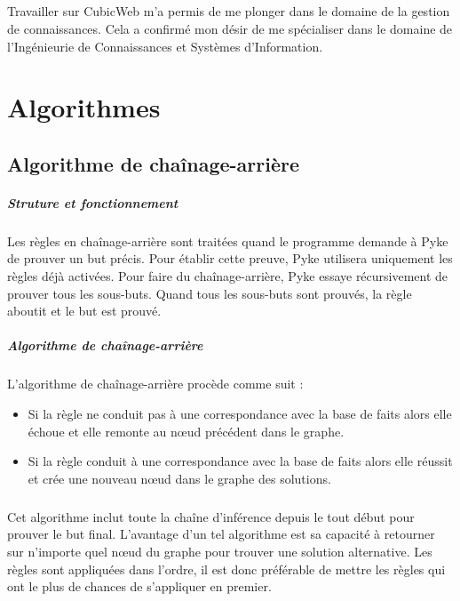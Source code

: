 \documentclass {report}
\begin{document}
\paragraph{}
Travailler sur CubicWeb m'a permis de me plonger dans le domaine de la gestion de connaissances. Cela a confirmé mon désir de me spécialiser dans le domaine de l'Ingénieurie de Connaissances et Systèmes d'Information.


\appendix


\chapter{Algorithmes}
\section{Algorithme de chaînage-arrière}

\paragraph{Struture et fonctionnement}
Les règles en chaînage-arrière sont traitées quand le programme demande à Pyke de prouver un but précis. Pour établir cette preuve, Pyke utilisera uniquement les règles déjà activées. Pour faire du chaînage-arrière, Pyke essaye récursivement de prouver tous les sous-buts. Quand tous les sous-buts sont prouvés, la règle aboutit et le but est prouvé.

\paragraph{Algorithme de chaînage-arrière}
    L'algorithme de chaînage-arrière procède comme suit : 
\begin{itemize}
    \item Si la règle ne conduit pas à une correspondance avec la base de faits alors elle échoue et elle remonte au nœud précédent dans le graphe.
    \item Si la règle conduit à une correspondance avec la base de faits alors elle réussit et crée une nouveau nœud dans le graphe des solutions.
\end{itemize}

\paragraph{}
Cet algorithme inclut toute la chaîne d'inférence depuis le tout début pour prouver le but final. L'avantage d'un tel algorithme est sa capacité à retourner sur n'importe quel nœud du graphe pour trouver une solution alternative. Les règles sont appliquées dans l'ordre, il est donc préférable de mettre les règles qui ont le plus de chances de s'appliquer en premier.
\end{document}
